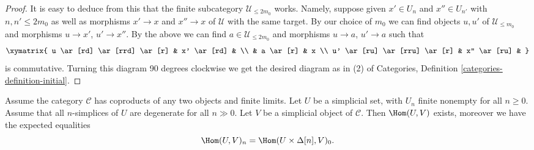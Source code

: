 \begin{proof}
\medskip\noindent
It is easy to deduce from this that the finite subcategory
$\mathcal{U}_{\leq 2m_0}$ works. Namely, suppose given
$x' \in U_n$ and $x'' \in U_{n'}$ with $n, n' \leq 2m_0$ as well as
morphisms $x' \to x$ and $x'' \to x$ of $\mathcal{U}$
with the same target. By our choice of $m_0$ we can
find objects $u, u'$ of $\mathcal{U}_{\leq m_0}$ and
morphisms $u \to x'$, $u' \to x''$.
By the above we can find $a \in \mathcal{U}_{\leq 2m_0}$
and morphisms $u \to a$, $u' \to a$ such that
$$
\xymatrix{
u \ar[rd] \ar[rrd] \ar[r] & x' \ar[rd] & \\
& a \ar[r] & x \\
u' \ar[ru] \ar[rru] \ar[r] & x'' \ar[ru] &
}
$$
is commutative. Turning this diagram 90 degrees clockwise
we get the desired diagram as in (2) of
Categories, Definition \ref{categories-definition-initial}.
\end{proof}

\begin{lemma}
\label{lemma-exists-hom-from-simplicial-set-finite}
Assume the category $\mathcal{C}$
has coproducts of any two objects and finite
limits. Let $U$ be a simplicial set, with $U_n$ finite nonempty
for all $n \geq 0$. Assume that all $n$-simplices
of $U$ are degenerate for all $n \gg 0$.
Let $V$ be a simplicial object of $\mathcal{C}$.
Then $\Hom(U, V)$ exists, moreover
we have the expected equalities
$$
\Hom(U, V)_n = \Hom(U \times \Delta[n], V)_0.
$$
\end{lemma}

